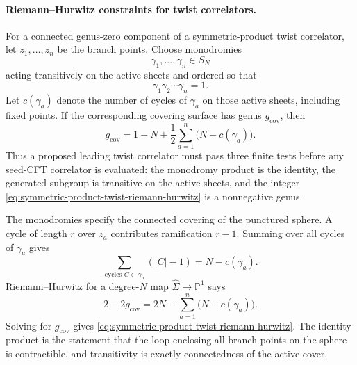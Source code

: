 \paragraph{Riemann--Hurwitz constraints for twist correlators.}
For a connected genus-zero component of a symmetric-product twist correlator,
let \(z_1,\ldots,z_n\) be the branch points.  Choose monodromies
\[
  \gamma_1,\ldots,\gamma_n\in S_N
\]
acting transitively on the active sheets and ordered so that
\begin{equation}
  \gamma_1\gamma_2\cdots\gamma_n=1.
  \label{eq:symmetric-product-sphere-monodromy-product}
\end{equation}
Let \(c(\gamma_a)\) denote the number of cycles of \(\gamma_a\) on those
active sheets, including fixed points.  If the corresponding covering surface
has genus \(g_{\mathrm{cov}}\), then
\begin{equation}
  g_{\mathrm{cov}}
  =
  1-N+\frac12
  \sum_{a=1}^n\bigl(N-c(\gamma_a)\bigr).
  \label{eq:symmetric-product-twist-riemann-hurwitz}
\end{equation}
Thus a proposed leading twist correlator must pass three finite tests before
any seed-CFT correlator is evaluated: the monodromy product is the identity,
the generated subgroup is transitive on the active sheets, and the integer
\eqref{eq:symmetric-product-twist-riemann-hurwitz} is a nonnegative genus.

The monodromies specify the connected covering of the punctured sphere.  A
cycle of length \(r\) over \(z_a\) contributes ramification \(r-1\).  Summing
over all cycles of \(\gamma_a\) gives
\begin{equation}
  \sum_{\text{cycles }C\subset\gamma_a}(|C|-1)
  =
  N-c(\gamma_a).
  \label{eq:symmetric-product-local-ramification}
\end{equation}
Riemann--Hurwitz for a degree-\(N\) map
\(\widehat\Sigma\to\mathbb P^1\) says
\[
  2-2g_{\mathrm{cov}}
  =
  2N-\sum_{a=1}^n\bigl(N-c(\gamma_a)\bigr).
\]
Solving for \(g_{\mathrm{cov}}\) gives
\eqref{eq:symmetric-product-twist-riemann-hurwitz}.  The identity product is
the statement that the loop enclosing all branch points on the sphere is
contractible, and transitivity is exactly connectedness of the active cover.

